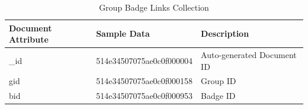 \begin{table}[H]
\caption{Group Badge Links Collection}\label{table:GroupBadgeLinksCollection}
\vspace{-0.2in}
\textbf{ }
\begin{center}
\begin{tabular}{ | l | l |  l | }
\hline
Document Attribute & Sample Data & Description \\ \hline
{\_}id & 514e34507075ae0c0f000004 & Auto-generated Document ID \\ \hline
gid & 514e34507075ae0c0f000158 & Group ID   \\ \hline
bid & 514e34507075ae0c0f000953 & Badge ID    \\ \hline
\end{tabular}
\end{center}
\end{table}


